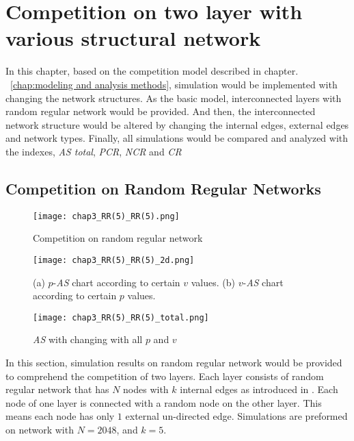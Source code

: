 

\chapter{Competition on two layer with various structural network}
\label{chap:competition on two layer with various structural network}
In this chapter, based on the competition model described in chapter. ~\ref{chap:modeling and analysis methods}, simulation would be implemented with changing the network structures. As the basic model, interconnected layers with random regular network would be provided. And then, the interconnected network structure would be altered by changing the internal edges, external edges and network types. Finally, all simulations would be compared and analyzed with the indexes, \textit{AS total}, \textit{PCR}, \textit{NCR} and \textit{CR}

\section{Competition on Random Regular Networks}
\label{competition on Random Regular Networks}
\begin{figure}[!h]
	\centering
	\texttt{[image: chap3\_RR(5)\_RR(5).png]}
	\caption{Competition on random regular network}
	\label{chap3_RR(5)_RR(5)}
\end{figure}
\begin{figure}[!h]
	\centering
	\texttt{[image: chap3\_RR(5)\_RR(5)\_2d.png]}
	\caption{(a) $p$-\textit{AS} chart according to certain $v$ values. (b) $v$-\textit{AS} chart according to certain $p$ values.}
	\label{chap3_RR(5)_RR(5)_2d}
\end{figure}
\begin{figure}[!h]
	\centering
	\texttt{[image: chap3\_RR(5)\_RR(5)\_total.png]}
	\caption{\textit{AS} with changing with all $p$ and $v$}
	\label{chap3_RR(5)_RR(5)_total}
\end{figure}
In this section, simulation results on random regular network would be provided to comprehend the competition of two layers. Each layer consists of random regular network that has $N$ nodes with $k$ internal edges as introduced in \parencite{kimsangwoo2012, choi2011, bela2001}. Each node of one layer is connected with a random node on the other layer. This means each node has only $1$ external un-directed edge. Simulations are preformed on network with $N=2048$, and $k = 5$. 

